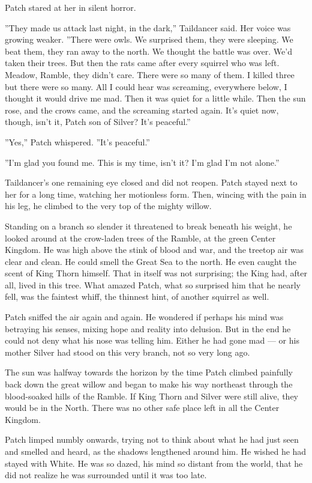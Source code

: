 \documentclass[12pt]{book}
\begin{document}
Patch stared at her in silent horror.

''They made us attack last night, in the dark,'' Taildancer said. Her
voice was growing weaker. ''There were owls. We surprised them, they
were sleeping. We beat them, they ran away to the north. We thought
the battle was over. We'd taken their trees. But then the rats came
after every squirrel who was left. Meadow, Ramble, they didn't
care. There were so many of them. I killed three but there were so
many. All I could hear was screaming, everywhere below, I thought it
would drive me mad. Then it was quiet for a little while. Then the sun
rose, and the crows came, and the screaming started again. It's quiet
now, though, isn't it, Patch son of Silver? It's peaceful.''

''Yes,'' Patch whispered. ''It's peaceful.''

''I'm glad you found me. This is my time, isn't it? I'm glad I'm not
alone.''

Taildancer's one remaining eye closed and did not reopen. Patch stayed
next to her for a long time, watching her motionless form. Then,
wincing with the pain in his leg, he climbed to the very top of the
mighty willow.

Standing on a branch so slender it threatened to break beneath his
weight, he looked around at the crow-laden trees of the Ramble, at the
green Center Kingdom. He was high above the stink of blood and war,
and the treetop air was clear and clean. He could smell the Great Sea
to the north. He even caught the scent of King Thorn himself. That in
itself was not surprising; the King had, after all, lived in this
tree. What amazed Patch, what so surprised him that he nearly fell,
was the faintest whiff, the thinnest hint, of another squirrel as
well.

Patch sniffed the air again and again. He wondered if perhaps his mind
was betraying his senses, mixing hope and reality into delusion. But
in the end he could not deny what his nose was telling him. Either he
had gone mad --- or his mother Silver had stood on this very branch,
not so very long ago.

The sun was halfway towards the horizon by the time Patch climbed
painfully back down the great willow and began to make his way
northeast through the blood-soaked hills of the Ramble. If King Thorn
and Silver were still alive, they would be in the North. There was no
other safe place left in all the Center Kingdom.

Patch limped numbly onwards, trying not to think about what he had
just seen and smelled and heard, as the shadows lengthened around
him. He wished he had stayed with White. He was so dazed, his mind so
distant from the world, that he did not realize he was surrounded
until it was too late.
\end{document}
